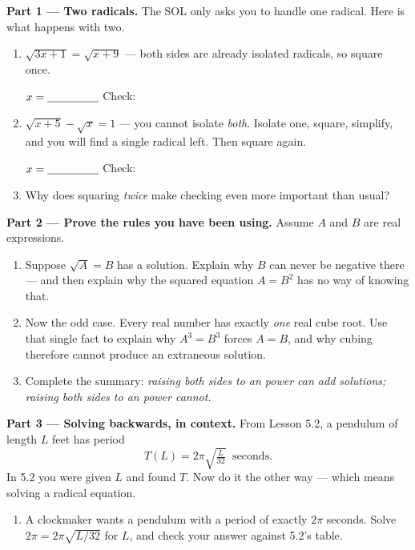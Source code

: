 \documentclass[10pt]{article}
\begin{document}
\begin{tcolorbox}[colback=white, colframe=black!40, title=\textbf{Tier E --- Extension},
    fonttitle=\bfseries, arc=1.5mm, left=3mm, right=3mm, top=2mm, bottom=2mm, breakable]
\textbf{Part 1 --- Two radicals.} The SOL only asks you to handle one radical. Here is what happens
with two.
\begin{enumerate}[label=(\alph*), leftmargin=1.9em, itemsep=6pt]
  \item $\sqrt{3x+1}=\sqrt{x+9}$ \; --- both sides are already isolated radicals, so square once.
        \vspace{0.45in}

        $x=\blank{1.6cm}$ \quad Check: \blank{4.0cm}
  \item $\sqrt{x+5}-\sqrt{x}=1$ \; --- you cannot isolate \emph{both}. Isolate one, square,
        simplify, and you will find a single radical left. Then square again.
        \vspace{1.10in}

        $x=\blank{1.6cm}$ \quad Check: \blank{4.0cm}
  \item Why does squaring \emph{twice} make checking even more important than usual?
\end{enumerate}

\vspace{4pt}
\textbf{Part 2 --- Prove the rules you have been using.} Assume $A$ and $B$ are real expressions.
\begin{enumerate}[label=(\alph*), leftmargin=1.9em, itemsep=6pt, start=4]
  \item Suppose $\sqrt{A}=B$ has a solution. Explain why $B$ can never be negative there --- and
        then explain why the squared equation $A=B^{2}$ has no way of knowing that. 
  \item Now the odd case. Every real number has exactly \emph{one} real cube root. Use that single
        fact to explain why $A^{3}=B^{3}$ forces $A=B$, and why cubing therefore cannot produce an
        extraneous solution. 
  \item Complete the summary: \emph{raising both sides to an \underline{\hspace{1.6cm}} power can
        add solutions; raising both sides to an \underline{\hspace{1.6cm}} power cannot.}
\end{enumerate}

\vspace{4pt}
\textbf{Part 3 --- Solving backwards, in context.} From Lesson 5.2, a pendulum of length $L$ feet
has period
\[ T(L)=2\pi\sqrt{\tfrac{L}{32}} \ \text{ seconds.} \]
In 5.2 you were given $L$ and found $T$. Now do it the other way --- which means solving a radical
equation.
\begin{enumerate}[label=(\alph*), leftmargin=1.9em, itemsep=6pt, start=7]
  \item A clockmaker wants a pendulum with a period of exactly $2\pi$ seconds. Solve
        $2\pi=2\pi\sqrt{L/32}$ for $L$, and check your answer against 5.2's table.
        \vspace{0.55in}


\end{enumerate}
\end{tcolorbox}
\end{document}
